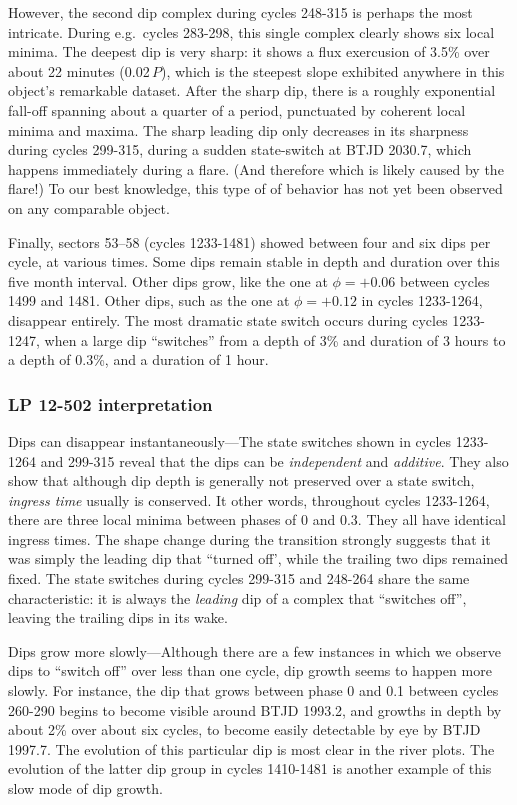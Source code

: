 \documentclass[11pt,twocolumn,tighten]{aastex63}
\begin{document}
However, the second dip complex during cycles 248-315 is perhaps the
most intricate.  During e.g.~cycles 283-298, this single complex
clearly shows six local minima.  The deepest dip is very sharp: it
shows a flux exercusion of 3.5\% over about 22 minutes (0.02\,$P$),
which is the steepest slope exhibited anywhere in this object's
remarkable dataset.  After the sharp dip, there is a roughly
exponential fall-off spanning about a quarter of a period, punctuated
by coherent local minima and maxima.  The sharp leading dip only
decreases in its sharpness during cycles 299-315, during a sudden
state-switch at BTJD 2030.7, which happens immediately during a flare.
(And therefore which is likely caused by the flare!) To our best
knowledge, this type of of behavior has not yet been observed on any
comparable object.

Finally, sectors 53--58 (cycles 1233-1481) showed between four and six
dips per cycle, at various times.  Some dips remain stable in depth
and duration over this five month interval.  Other dips grow, like the
one at $\phi = +0.06$ between cycles 1499 and 1481.  Other dips, such
as the one at $\phi = +0.12$ in cycles 1233-1264, disappear entirely.
The most dramatic state switch occurs during cycles 1233-1247, when a
large dip ``switches'' from a depth of 3\% and duration of 3 hours to
a depth of 0.3\%, and a duration of 1 hour.

\subsubsection{LP 12-502 interpretation}

{\sc Dips can disappear instantaneously}---The state switches shown in
cycles 1233-1264 and 299-315 reveal that the dips can be {\it
independent} and {\it additive}.  They also show that although dip
depth is generally not preserved over a state switch, {\it ingress
time} usually is conserved.  It other words, throughout cycles
1233-1264, there are three local minima between phases of 0 and 0.3.
They all have identical ingress times.  The shape change during the
transition strongly suggests that it was simply the leading dip that
``turned off', while the trailing two dips remained fixed.  The state
switches during cycles 299-315 and 248-264 share the same
characteristic: it is always the {\it leading} dip of a complex that
``switches off'', leaving the trailing dips in its wake.

{\sc Dips grow more slowly}---Although there are a few instances in
which we observe dips to ``switch off'' over less than one cycle, dip
growth seems to happen more slowly.  For instance, the dip that grows
between phase 0 and 0.1 between cycles 260-290 begins to become
visible around BTJD 1993.2, and growths in depth by about 2\% over
about six cycles, to become easily detectable by eye by BTJD 1997.7.
The evolution of this particular dip is most clear in the river plots.
The evolution of the latter dip group in cycles 1410-1481 is another
example of this slow mode of dip growth.
\end{document}
